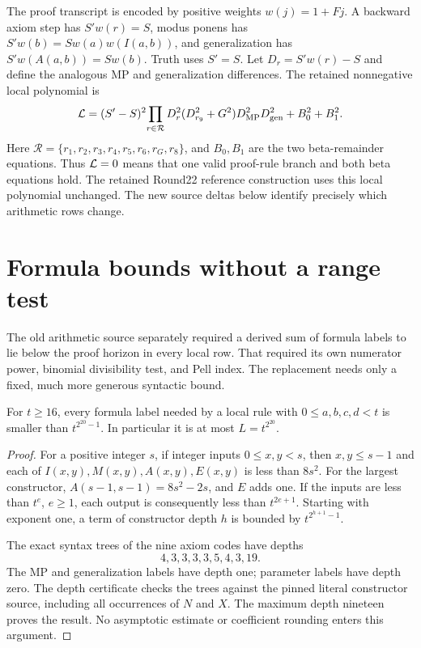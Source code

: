 The proof transcript is encoded by positive weights $w(j)=1+Fj$.
A backward axiom step has $S'w(r)=S$, modus ponens has
$S'w(b)=S w(a)w(I(a,b))$, and generalization has
$S'w(A(a,b))=S w(b)$. Truth uses $S'=S$.
Let $D_r=S'w(r)-S$ and define the analogous MP and generalization
differences. The retained nonnegative local polynomial is
\[
 \mathcal L=(S'-S)^2\!\prod_{r\in\mathcal R}D_r^2
       (D_{r_9}^2+G^2)D_{\rm MP}^2D_{\rm gen}^2+B_0^2+B_1^2.
\]
Here $\mathcal R=\{r_1,r_2,r_3,r_4,r_5,r_6,r_G,r_8\}$, and $B_0,B_1$ are the two beta-remainder equations. Thus $\mathcal L=0$
means that one valid proof-rule branch and both beta equations hold.
The retained Round22 reference construction uses this local polynomial unchanged.
The new source deltas below identify precisely which arithmetic rows change.

\section{Formula bounds without a range test}

The old arithmetic source separately required a derived sum of formula
labels to lie below the proof horizon in every local row. That required
its own numerator power, binomial divisibility test, and Pell index.
The replacement needs only a fixed, much more generous syntactic bound.

\begin{lemma}\label{lem:depth}
For $t\ge16$, every formula label needed by a local rule with
$0\le a,b,c,d<t$ is smaller than $t^{2^{20}-1}$.
In particular it is at most $L=t^{2^{20}}$.
\end{lemma}
\begin{proof}
For a positive integer $s$, if integer inputs $0\le x,y<s$, then
$x,y\le s-1$ and each of
$I(x,y),M(x,y),A(x,y),E(x,y)$ is less than $8s^2$.
For the largest constructor,
$A(s-1,s-1)=8s^2-2s$, and $E$ adds one. If the inputs are
less than $t^e$, $e\ge1$, each output is consequently less than
$t^{2e+1}$. Starting with exponent one, a term of constructor depth
$h$ is bounded by $t^{2^{h+1}-1}$.

The exact syntax trees of the nine axiom codes have depths
\[
                 4,3,3,3,3,5,4,3,19.
\]
The MP and generalization labels have depth one; parameter labels have
depth zero. The depth certificate checks the trees against the pinned
literal constructor source, including all occurrences of $N$ and $X$.
The maximum depth nineteen proves the result. No asymptotic estimate or
coefficient rounding enters this argument.
\end{proof}

